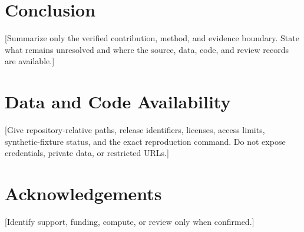 \documentclass[10pt,a4paper]{article}
\begin{document}
\section{Conclusion}
[Summarize only the verified contribution, method, and evidence boundary. State
  what remains unresolved and where the source, data, code, and
  review records are
available.]

\section*{Data and Code Availability}
[Give repository-relative paths, release identifiers, licenses, access limits,
  synthetic-fixture status, and the exact reproduction command. Do not expose
credentials, private data, or restricted URLs.]

\section*{Acknowledgements}
[Identify support, funding, compute, or review only when confirmed.]

% 
% 

\appendix
\end{document}
